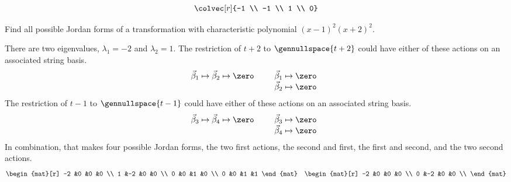 \begin{exercises}
\begin{answer}
\begin{exparts}
\begin{equation*}
{                          \colvec[r]{-1 \\ -1 \\ 1 \\ 0}}
            \end{equation*}
      \end{exparts}  
    \end{answer}
  \recommended \item
    Find all possible Jordan forms of a transformation with characteristic
    polynomial \( (x-1)^2(x+2)^2  \).
    \begin{answer}
      There are two eigenvalues, $\lambda_1=-2$ and $\lambda_2=1$.
      The restriction of $t+2$ to 
      $\gennullspace{t+2}$ could have either of these actions 
      on an associated string basis.
      \begin{equation*}
        \vec{\beta}_1\mapsto\vec{\beta}_2\mapsto\zero
        \qquad
        \begin{array}[t]{l}
          \vec{\beta}_1\mapsto\zero  \\
          \vec{\beta}_2\mapsto\zero 
        \end{array}
      \end{equation*}
      The restriction of $t-1$ to 
      $\gennullspace{t-1}$ could have either of these actions 
      on an associated string basis.
      \begin{equation*}
        \vec{\beta}_3\mapsto\vec{\beta}_4\mapsto\zero
        \qquad
        \begin{array}[t]{l}
          \vec{\beta}_3\mapsto\zero  \\
          \vec{\beta}_4\mapsto\zero 
        \end{array}
      \end{equation*}
      In combination, that makes four possible Jordan forms,
      the two first actions, the second and first, the first and second, and
      the two second actions.
      \begin{equation*}
        \begin{mat}[r]
          -2  &0  &0  &0  \\
           1  &-2 &0  &0  \\
           0  &0  &1  &0  \\
           0  &0  &1  &1
        \end{mat}
        \quad
        \begin{mat}[r]
          -2  &0  &0  &0  \\
           0  &-2 &0  &0  \\

\end{mat}
\end{equation*}
\end{answer}
\end{exercises}
